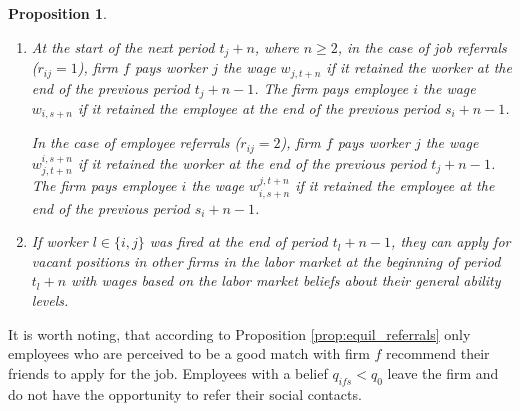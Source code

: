 \documentclass[12pt]{article}
\newtheorem{proposition}{Proposition}
\begin{document}
\begin{proposition}
\begin{enumerate}[label={\roman*})]
In the case of job referrals ($r_{ij} = 1$), the firm retains worker $j$ if its belief about worker $j$ being a good match with the firm satisfies $q_{j,t+n-1} \geq q_0$; the firm retains employee $i$ if its belief about worker $j$ being a good match with the firm satisfies $q_{i,s+n-1} \geq q_0$. The firm's profit from employing worker $j$ is equal to $\Pi_{j,f,t+n-1} = y_{j,f,t+n-1} - w_{j, t+n-1}$; the firm's profit from employing employee $i$ is equal to $\Pi_{i,f,s+n-1} = y_{i,f,s+n-1} - w_{i, s+n-1}$.

In the case of employee referrals ($r_{ij}=2$), the firm retains worker $j$ if its belief about worker $j$ being a good match with the firm satisfies $q_{j,t+n-1}^{i,s+n-1} \geq q_0$; the firm retains worker $i$ if its belief about employee $i$ being a good match with the firm satisfies $q_{i,s+n-1}^{j,t+n-1} \geq q_0$. The firm's profit from employing worker $j$ is equal to $\Pi_{j,f,t+n-1}^{i,f,s+n-1} = y_{j,f,t+n-1} - w_{j, t+n-1}^{i,s+n-1}$; the firm's profit from employing employee $i$ is equal to $\Pi_{i,f,s+n-1}^{j,f,t+n-1} = y_{i,f,s+n-1} - w_{i, s+n-1}^{j,t+n-1}$.

\item At the start of the next period $t_j + n$, where $n \geq 2$, in the case of job referrals ($r_{ij} = 1$), firm $f$ pays worker $j$ the wage $w_{j,t+n}$ if it retained the worker at the end of the previous period $t_j+n-1$. The firm pays employee $i$ the wage $w_{i,s+n}$ if it retained the employee at the end of the previous period $s_i+n-1$.

In the case of employee referrals ($r_{ij} = 2$), firm $f$ pays worker $j$ the wage $w_{j,t+n}^{i,s+n}$ if it retained the worker at the end of the previous period $t_j+n-1$. The firm pays employee $i$ the wage $w_{i,s+n}^{j,t+n}$ if it retained the employee at the end of the previous period $s_i+n-1$.

\item If worker $l \in \lbrace i,j \rbrace$ was fired at the end of period $t_l+n-1$, they can apply for vacant positions in other firms in the labor market at the beginning of period $t_l+n$ with wages based on the labor market beliefs about their general ability levels.

\end{enumerate}
\end{proposition}

It is worth noting, that according to Proposition \ref{prop:equil_referrals} only employees who are perceived to be a good match with firm $f$ recommend their friends to apply for the job. Employees with a belief $q_{ifs} < q_0$ leave the firm and do not have the opportunity to refer their social contacts.
\end{document}
